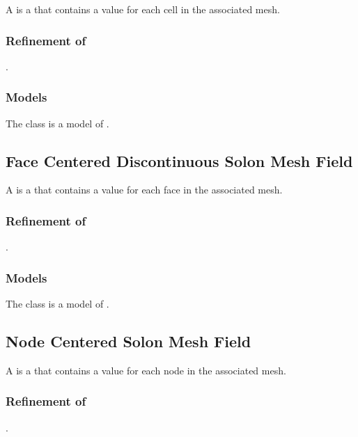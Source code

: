 \documentclass[note]{newmemo}
\begin{document}
A  is a  that contains a value for each cell in the associated mesh.

\subsubsection{Refinement of}
.

\subsubsection{Models}

The  class is a model of .

\bigskip

\subsection{Face Centered Discontinuous Solon Mesh Field}

A  is a
 that contains a value for each face in the
associated mesh.

\subsubsection{Refinement of}
.

\subsubsection{Models}

The  class is a model of .

\bigskip

\subsection{Node Centered Solon Mesh Field}

A  is a  that contains a value for each node in the associated mesh.

\subsubsection{Refinement of}
.
\end{document}
